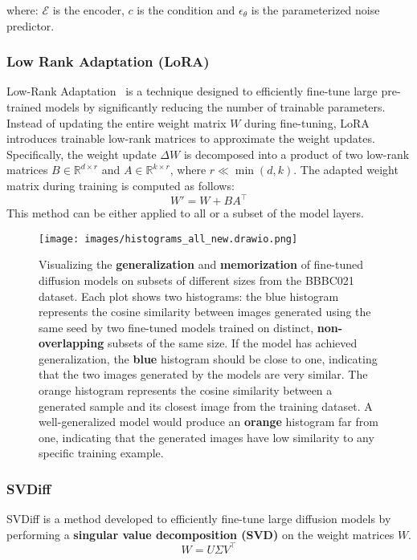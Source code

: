 where: $\mathcal{E}$ is the encoder, $c$ is the condition and $\epsilon_\theta$ is the parameterized noise predictor. 

\subsubsection{Low Rank Adaptation (LoRA)}
Low-Rank Adaptation~\cite{lora} is a technique designed to efficiently fine-tune large pre-trained models by significantly reducing the number of trainable parameters. Instead of updating the entire weight matrix \( W \) during fine-tuning, LoRA introduces trainable low-rank matrices to approximate the weight updates. Specifically, the weight update \( \Delta W \) is decomposed into a product of two low-rank matrices \( B \in \mathbb{R}^{d \times r} \) and \( A \in \mathbb{R}^{k \times r} \), where \( r \ll \min(d, k) \). The adapted weight matrix during training is computed as follows:
\begin{equation}
W' = W + BA^\top
\end{equation}
This method can be either applied to all or a subset of the model layers.


\begin{figure*}

  \centering
  \texttt{[image: images/histograms\_all\_new.drawio.png]} %
  \caption{Visualizing the \textbf{generalization} and \textbf{memorization} of fine-tuned diffusion models on subsets of different sizes from the BBBC021 dataset. Each plot shows two histograms: the blue histogram represents the cosine similarity between images generated using the same seed by two fine-tuned models trained on distinct, \textbf{non-overlapping} subsets of the same size. If the model has achieved generalization, the \textbf{blue} histogram should be close to one, indicating that the two images generated by the models are very similar. The orange histogram represents the cosine similarity between a generated sample and its closest image from the training dataset. A well-generalized model would produce an \textbf{orange} histogram far from one, indicating that the generated images have low similarity to any specific training example.}


  \label{fig:histograms}
\end{figure*}



\subsubsection{SVDiff}
SVDiff is a method developed to efficiently fine-tune large diffusion models by performing a \textbf{ singular value decomposition (SVD)} on the weight matrices $W$.
\[
W = U \Sigma V^\top
\]



